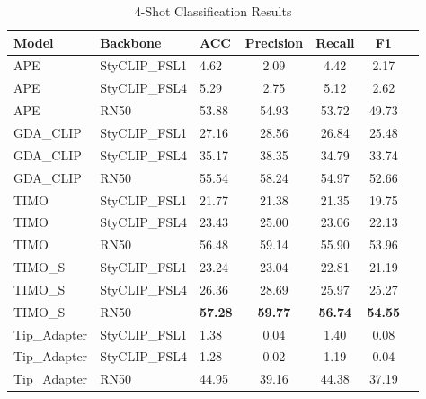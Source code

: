 \documentclass[conference,6pt]{IEEEtran}
\begin{document}
\begin{table}[H]
\centering
\tiny
\caption{4-Shot Classification Results}
\label{tab:results_4shot}
\begin{tabular}{@{}lll*{4}{S[table-format=2.2]}@{}}
\toprule
\textbf{Model} & \textbf{Backbone} & \textbf{ACC} & \textbf{Precision} & \textbf{Recall} & \textbf{F1} \\
\midrule
APE & StyCLIP\_FSL1 & 4.62 & 2.09 & 4.42 & 2.17 \\
APE & StyCLIP\_FSL4 & 5.29 & 2.75 & 5.12 & 2.62 \\
APE & RN50 & 53.88 & 54.93 & 53.72 & 49.73 \\
GDA\_CLIP & StyCLIP\_FSL1 & 27.16 & 28.56 & 26.84 & 25.48 \\
GDA\_CLIP & StyCLIP\_FSL4 & 35.17 & 38.35 & 34.79 & 33.74 \\
GDA\_CLIP & RN50 & 55.54 & 58.24 & 54.97 & 52.66 \\
TIMO & StyCLIP\_FSL1 & 21.77 & 21.38 & 21.35 & 19.75 \\
TIMO & StyCLIP\_FSL4 & 23.43 & 25.00 & 23.06 & 22.13 \\
TIMO & RN50 & 56.48 & 59.14 & 55.90 & 53.96 \\
TIMO\_S & StyCLIP\_FSL1 & 23.24 & 23.04 & 22.81 & 21.19 \\
TIMO\_S & StyCLIP\_FSL4 & 26.36 & 28.69 & 25.97 & 25.27 \\
TIMO\_S & RN50 & \textbf{57.28} & \textbf{59.77} & \textbf{56.74} & \textbf{54.55} \\
Tip\_Adapter & StyCLIP\_FSL1 & 1.38 & 0.04 & 1.40 & 0.08 \\
Tip\_Adapter & StyCLIP\_FSL4 & 1.28 & 0.02 & 1.19 & 0.04 \\
Tip\_Adapter & RN50 & 44.95 & 39.16 & 44.38 & 37.19 \\
\bottomrule
\end{tabular}
\end{table}
\end{document}
